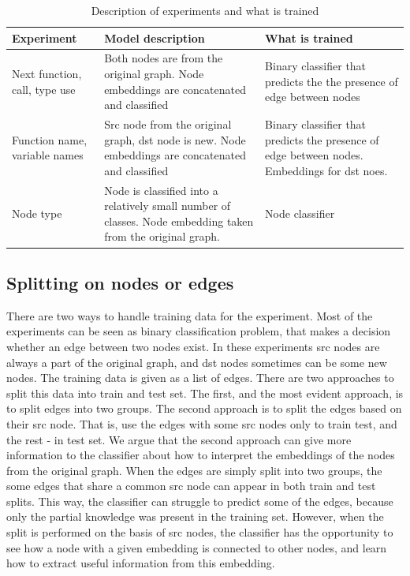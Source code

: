 \documentclass[a4paper,twoside]{article}
\begin{document}
\begin{table}
    \centering
    \caption{Description of experiments and what is trained \label{tbl:experiment_desc}}
    \begin{tabular}{|p{3cm}|p{6cm}|p{6cm}|}
    \hline
        \textbf{Experiment} & \textbf{Model description} & \textbf{What is trained} \\ \hline
        Next function, call, type use & Both nodes are from the original graph. Node embeddings are concatenated and classified & Binary classifier that predicts the the presence of edge between nodes \\ \hline
        Function name, variable names & Src node from the original graph, dst node is new. Node embeddings are concatenated and classified & Binary classifier that predicts the presence of edge between nodes. Embeddings for dst noes. \\ \hline
        Node type & Node is classified into a relatively small number of classes. Node embedding taken from the original graph. & Node classifier \\ \hline
    \end{tabular}
\end{table}

\subsection{Splitting on nodes or edges}

There are two ways to handle training data for the experiment. Most of the experiments can be seen as binary classification problem, that makes a decision whether an edge between two nodes exist. In these experiments src nodes are always a part of the original graph, and dst nodes sometimes can be some new nodes. The training data is given as a list of edges. There are two approaches to split this data into train and test set. The first, and the most evident approach, is to split edges into two groups. The second approach is to split the edges based on their src node. That is, use the edges with some src nodes only to train test, and the rest - in test set. 
We argue that the second approach can give more information to the classifier about how to interpret the embeddings of the nodes from the original graph. When the edges are simply split into two groups, the some edges that share a common src node can appear in both train and test splits. This way, the classifier can struggle to predict some of the edges, because only the partial knowledge was present in the training set. However, when the split is performed on the basis of src nodes, the classifier has the opportunity to see how a node with a given embedding is connected to other nodes, and learn how to extract useful information from this embedding. 
\end{document}
